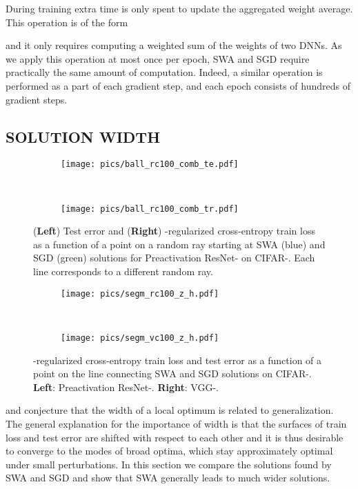 \documentclass[letterpaper]{article}
\begin{document}
During training extra time is only spent to update the aggregated weight average.
This operation is of the form

and it only requires computing a weighted sum of the weights of two DNNs. As we
apply this operation at most once per epoch, SWA and SGD require practically the same 
amount of computation. Indeed, a similar operation is performed as a part of each 
gradient step, and each epoch consists of hundreds of gradient steps. 

\subsection{SOLUTION WIDTH}
\begin{figure*}[!h]
	\centering
	\begin{subfigure}{0.42\textwidth}
		\texttt{[image: pics/ball\_rc100\_comb\_te.pdf]}
	\end{subfigure}
	~~~~
	\begin{subfigure}{0.42\textwidth}
		\texttt{[image: pics/ball\_rc100\_comb\_tr.pdf]}
	\end{subfigure}
	\caption{
      (\textbf{Left}) Test error and (\textbf{Right}) -regularized 
      cross-entropy train loss as a function of 
      a point on a random ray starting at SWA (blue) and SGD (green) solutions
      for Preactivation ResNet- on CIFAR-.
      Each line corresponds to a different random ray.
  }
	\label{fig:rand_ray}
\end{figure*}
\label{sec:optima_width}
\begin{figure*}[!h]
	\centering
	\centering
	\begin{subfigure}{0.42\textwidth}
	  \texttt{[image: pics/segm\_rc100\_z\_h.pdf]}
	\end{subfigure}
	~~~~
	\begin{subfigure}{0.42\textwidth}
	  \texttt{[image: pics/segm\_vc100\_z\_h.pdf]}
	\end{subfigure}
	\caption{
      -regularized cross-entropy train loss and test error as a function of
      a point on the line connecting SWA and SGD solutions on CIFAR-.
      \textbf{Left}: Preactivation ResNet-. \textbf{Right}: VGG-.
      }
	\label{fig:optima_seg}
\end{figure*}

\citet{keskar2017large} and \citet{chaudhari2016} conjecture that the width of a local
optimum is related to generalization.
The general explanation for the importance of width is that the surfaces of train
loss and test error are shifted with respect to each other and it is thus desirable
to converge to the modes of broad optima, which stay approximately optimal under small 
perturbations. In this section we compare the solutions found by SWA and SGD
and show that SWA generally leads to much wider solutions.
\end{document}
